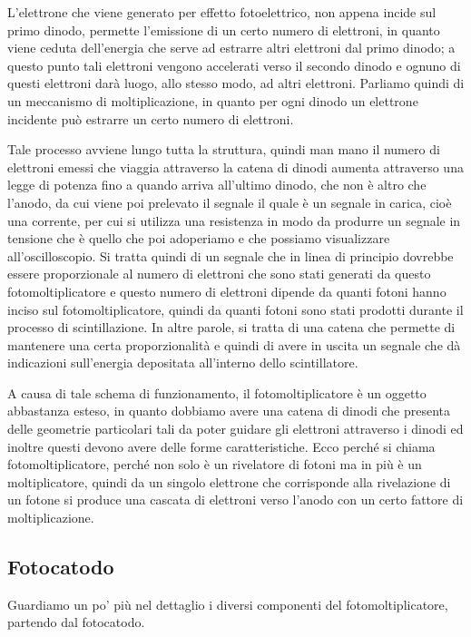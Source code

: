 L'elettrone che viene generato per effetto fotoelettrico, non appena incide sul primo dinodo, permette l'emissione di un certo numero di elettroni, in quanto viene ceduta dell'energia che serve ad estrarre altri elettroni dal primo dinodo; a questo punto tali elettroni vengono accelerati verso il secondo dinodo e ognuno di questi elettroni darà luogo, allo stesso modo, ad altri elettroni. Parliamo quindi di un meccanismo di moltiplicazione, in quanto per ogni dinodo un elettrone incidente può estrarre un certo numero di elettroni.

Tale processo avviene lungo tutta la struttura, quindi man mano il numero di elettroni emessi che viaggia attraverso la catena di dinodi aumenta attraverso una legge di potenza fino a quando arriva all'ultimo dinodo, che non è altro che l'anodo, da cui viene poi prelevato il segnale il quale è un segnale in carica, cioè una corrente, per cui si utilizza una resistenza in modo da produrre un segnale in tensione che è quello che poi adoperiamo e che possiamo visualizzare all'oscilloscopio. Si tratta quindi di un segnale che in linea di principio dovrebbe essere proporzionale al numero di elettroni che sono stati generati da questo fotomoltiplicatore e questo numero di elettroni dipende da quanti fotoni hanno inciso sul fotomoltiplicatore, quindi da quanti fotoni sono stati prodotti durante il processo di scintillazione. In altre parole, si tratta di una catena che permette di mantenere una certa proporzionalità e quindi di avere in uscita un segnale che dà indicazioni sull'energia depositata all'interno dello scintillatore.

A causa di tale schema di funzionamento, il fotomoltiplicatore è un oggetto abbastanza esteso, in quanto dobbiamo avere una catena di dinodi che presenta delle geometrie particolari tali da poter guidare gli elettroni attraverso i dinodi ed inoltre questi devono avere delle forme caratteristiche. Ecco perché si chiama fotomoltiplicatore, perché non solo è un rivelatore di fotoni ma in più è un moltiplicatore, quindi da un singolo elettrone che corrisponde alla rivelazione di un fotone si produce una cascata di elettroni verso l'anodo con un certo fattore di moltiplicazione.

\subsection{Fotocatodo}
Guardiamo un po' più nel dettaglio i diversi componenti del fotomoltiplicatore, partendo dal fotocatodo.

